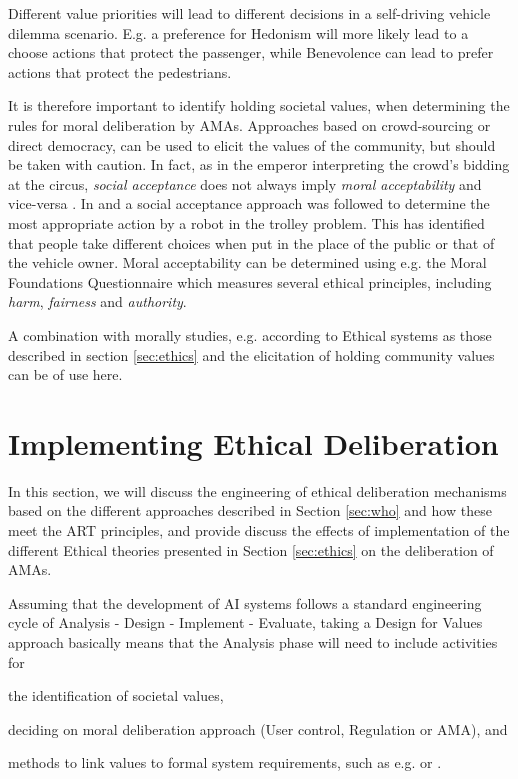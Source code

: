 \documentclass[twocolumn]{article}
\begin{document}
Different value priorities will lead to different decisions in a self-driving vehicle dilemma scenario. E.g. a preference for Hedonism will more likely lead to a choose actions that protect the passenger, while Benevolence can lead to prefer actions that protect the pedestrians. 

It is therefore important to identify holding societal values, when determining the rules for moral deliberation by AMAs. Approaches based on crowd-sourcing or direct democracy, can be used to elicit the values of the community, but should be taken with caution. In fact, as in the emperor interpreting the crowd's bidding at the circus, \textit{social acceptance} does not always imply \textit{moral acceptability} and vice-versa \cite{verdiesen2016mood}. In \cite{malle2015sacrifice} and \cite{Bonnefon1573} a social acceptance approach was followed to determine the most appropriate action by a robot in the trolley problem. This has identified that people take different choices when put in the place of the public or that of the vehicle owner. Moral acceptability can be determined using e.g. the Moral Foundations Questionnaire \cite{graham2011mapping} which measures several ethical principles, including \textit{harm}, \textit{fairness} and \textit{authority}.

A combination with morally studies, e.g. according to Ethical systems as those described in section \ref{sec:ethics} and the elicitation of holding community values can be of use here.


\section{Implementing Ethical Deliberation}\label{sec:reasoning}
In this section, we will discuss the engineering of ethical deliberation mechanisms based on the different approaches described in Section \ref{sec:who} and how these meet the ART principles, and provide discuss the effects of implementation of the different Ethical theories presented in Section \ref{sec:ethics} on the deliberation of AMAs.

Assuming that the development of AI systems follows a standard engineering cycle of Analysis - Design - Implement - Evaluate, taking a Design for Values approach basically means that the Analysis phase will need to include activities for 
\begin{inparaenum}[(i)] 
\item the identification of societal values, 
\item deciding on moral deliberation approach (User control, Regulation or AMA), and
\item methods to link values to formal system requirements, such as e.g. \cite{vandePoel2013} or \cite{aldewereld2010making}.
\end{inparaenum}
\end{document}
